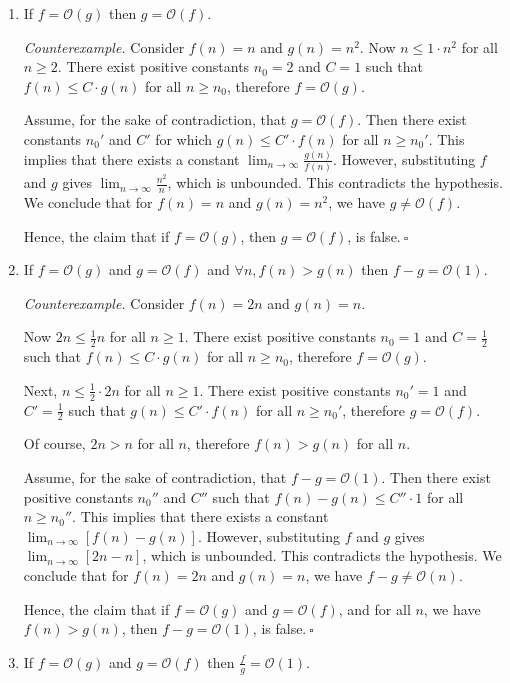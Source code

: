 \begin{enumerate}
\item If $f=\mathcal{O}(g)$ then $g=\mathcal{O}(f)$.

\textit{Counterexample. }Consider $f(n)=n$ and $g(n)=n^2$. Now $n\leq 1\cdot n^2$ for all $n\geq 2$. There exist positive constants $n_0=2$ and $C=1$ such that $f(n)\leq C\cdot g(n)$ for all $n\geq n_0$, therefore $f=\mathcal{O}(g)$.

Assume, for the sake of contradiction, that $g=\mathcal{O}(f)$. Then there exist constants $n_0'$ and $C'$ for which $g(n)\leq C'\cdot f(n)$ for all $n\geq n_0'$. This implies that there exists a constant $\lim_{n\to\infty}{\frac{g(n)}{f(n)}}$. However, substituting $f$ and $g$ gives $\lim_{n\to\infty}{\frac{n^2}{n}}$, which is unbounded. This contradicts the hypothesis. We conclude that for $f(n)=n$ and $g(n)=n^2$, we have $g\neq\mathcal{O}(f)$.

Hence, the claim that if $f=\mathcal{O}(g)$, then $g=\mathcal{O}(f)$, is false.$~\square$
\item If $f=\mathcal{O}(g)$ and $g=\mathcal{O}(f)$ and $\forall n, f(n)>g(n)$ then $f-g=\mathcal{O}(1)$.

\textit{Counterexample. }Consider $f(n)=2n$ and $g(n)=n$.

Now $2n\leq\frac{1}{2}n$ for all $n\geq 1$. There exist positive constants $n_0=1$ and $C=\frac{1}{2}$ such that $f(n)\leq C\cdot g(n)$ for all $n\geq n_0$, therefore $f=\mathcal{O}(g)$.

Next, $n\leq\frac{1}{2}\cdot 2n$ for all $n\geq 1$. There exist positive constants $n_0'=1$ and $C'=\frac{1}{2}$ such that $g(n)\leq C'\cdot f(n)$ for all $n\geq n_0'$, therefore $g=\mathcal{O}(f)$.

Of course, $2n>n$ for all $n$, therefore $f(n)>g(n)$ for all $n$.

Assume, for the sake of contradiction, that $f-g=\mathcal{O}(1)$. Then there exist positive constants $n_0''$ and $C''$ such that $f(n)-g(n)\leq C''\cdot 1$ for all $n\geq n_0''$. This implies that there exists a constant  $\lim_{n\to\infty}\left[f(n)-g(n)\right]$. However, substituting $f$ and $g$ gives $\lim_{n\to\infty}{[2n-n]}$, which is unbounded. This contradicts the hypothesis. We conclude that for $f(n)=2n$ and $g(n)=n$, we have $f-g\neq\mathcal{O}(n)$.

Hence, the claim that if $f=\mathcal{O}(g)$ and $g=\mathcal{O}(f)$, and for all $n$, we have $f(n)>g(n)$, then $f-g=\mathcal{O}(1)$, is false.$~\square$
\item If $f=\mathcal{O}(g)$ and $g=\mathcal{O}(f)$ then $\frac{f}{g}=\mathcal{O}(1)$.


\end{enumerate}
